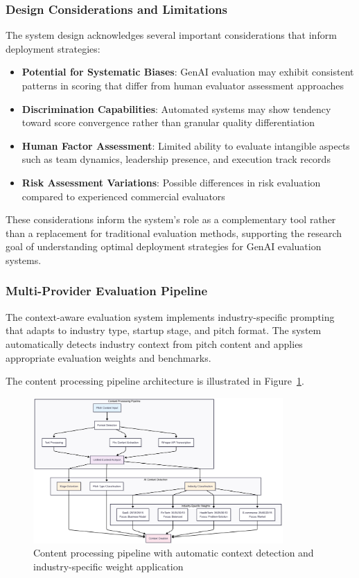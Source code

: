 \subsubsection{Design Considerations and Limitations}
The system design acknowledges several important considerations that inform deployment strategies:

\begin{itemize}
  \item \textbf{Potential for Systematic Biases}: GenAI evaluation may exhibit consistent patterns in scoring that differ from human evaluator assessment approaches
  \item \textbf{Discrimination Capabilities}: Automated systems may show tendency toward score convergence rather than granular quality differentiation
  \item \textbf{Human Factor Assessment}: Limited ability to evaluate intangible aspects such as team dynamics, leadership presence, and execution track records
  \item \textbf{Risk Assessment Variations}: Possible differences in risk evaluation compared to experienced commercial evaluators
\end{itemize}

These considerations inform the system's role as a complementary tool rather than a replacement for traditional evaluation methods, supporting the research goal of understanding optimal deployment strategies for GenAI evaluation systems.

\subsubsection{Multi-Provider Evaluation Pipeline}
The context-aware evaluation system implements industry-specific prompting that adapts to industry type, startup stage, and pitch format. The system automatically detects industry context from pitch content and applies appropriate evaluation weights and benchmarks.

The content processing pipeline architecture is illustrated in Figure~\ref{fig:eval-flow-context}.

\begin{figure}[H]
  \centering
  \includegraphics[width=0.85\textwidth]{img/eval-flow-context}
  \caption{Content processing pipeline with automatic context detection and industry-specific weight application}
  \label{fig:eval-flow-context}
\end{figure}

